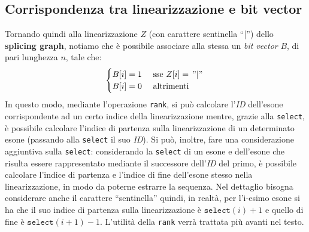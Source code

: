 \documentclass[a4paper,12pt, oneside]{book}
\begin{document}
\subsection{Corrispondenza tra linearizzazione e bit vector}
Tornando quindi alla linearizzazione $Z$ (con carattere sentinella ``|'') dello
\textbf{splicing graph}, notiamo che è possibile associare alla stessa un
\textit{bit vector} $B$, di pari lunghezza $n$, tale che:
\[
  \begin{cases}
    B[i] = 1 &\mbox{ sse } Z[i] = \,"|"\,\\
    B[i] = 0 &\mbox{ altrimenti}
  \end{cases}
\]
In questo modo, mediante l'operazione \texttt{rank}, si può calcolare
l'\textit{ID} dell'esone corrispondente ad un certo indice della linearizzazione
mentre, grazie alla \texttt{select}, è possibile calcolare l'indice di partenza
sulla linearizzazione di un determinato esone (passando alla \texttt{select} il
suo \textit{ID}). Si può, inoltre, fare una considerazione aggiuntiva sulla
\texttt{select}: considerando la \texttt{select} di un esone e dell'esone che
risulta essere rappresentato mediante il successore dell'\textit{ID} del primo,
è possibile calcolare l'indice di partenza e l'indice di fine dell'esone stesso
nella linearizzazione, in modo da poterne estrarre la sequenza. Nel dettaglio
bisogna considerare anche il carattere ``sentinella'' 
quindi, in realtà, per l'i-esimo esone si ha che il suo indice di partenza sulla
linearizzazione è $\mathtt{select}(i)+1$ e quello di fine è
$\mathtt{select}(i+1)-1$. L'utilità della \texttt{rank} verrà trattata più
avanti nel testo.   
\end{document}
